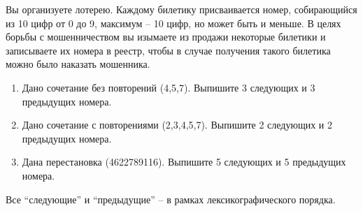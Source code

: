 \question
Вы организуете лотерею. Каждому билетику присваивается номер, собирающийся из 10 цифр от 0 до 9, максимум – 10 цифр, но может быть и меньше. В целях борьбы с мошенничеством вы изымаете из продажи некоторые билетики и записываете их номера в реестр, чтобы в случае получения такого билетика можно было наказать мошенника.

\begin{enumerate}
\item Дано сочетание без повторений (4,5,7). Выпишите 3 следующих и 3 предыдущих номера.
	\item Дано сочетание с повторениями (2,3,4,5,7). Выпишите 2 следующих и 2 предыдущих номера.
	\item Дана перестановка (4622789116). Выпишите 5 следующих и 5 предыдущих номера.
\end{enumerate}

Все “следующие” и “предыдущие” – в рамках лексикографического порядка.
